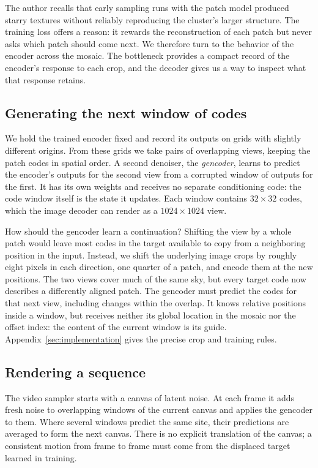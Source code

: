 The author recalls that early sampling runs with the patch model produced starry textures without reliably reproducing the cluster's larger structure. The training loss offers a reason: it rewards the reconstruction of each patch but never asks which patch should come next. We therefore turn to the behavior of the encoder across the mosaic. The bottleneck provides a compact record of the encoder's response to each crop, and the decoder gives us a way to inspect what that response retains.

\subsection{Generating the next window of codes}

We hold the trained encoder fixed and record its outputs on grids with slightly different origins. From these grids we take pairs of overlapping views, keeping the patch codes in spatial order. A second denoiser, the \emph{gencoder}, learns to predict the encoder's outputs for the second view from a corrupted window of outputs for the first. It has its own weights and receives no separate conditioning code: the code window itself is the state it updates. Each window contains $32\times32$ codes, which the image decoder can render as a $1024\times1024$ view.

How should the gencoder learn a continuation? Shifting the view by a whole patch would leave most codes in the target available to copy from a neighboring position in the input. Instead, we shift the underlying image crops by roughly eight pixels in each direction, one quarter of a patch, and encode them at the new positions. The two views cover much of the same sky, but every target code now describes a differently aligned patch. The gencoder must predict the codes for that next view, including changes within the overlap. It knows relative positions inside a window, but receives neither its global location in the mosaic nor the offset index: the content of the current window is its guide. Appendix~\ref{sec:implementation} gives the precise crop and training rules.

\subsection{Rendering a sequence}

The video sampler starts with a canvas of latent noise. At each frame it adds fresh noise to overlapping windows of the current canvas and applies the gencoder to them. Where several windows predict the same site, their predictions are averaged to form the next canvas. There is no explicit translation of the canvas; a consistent motion from frame to frame must come from the displaced target learned in training.

